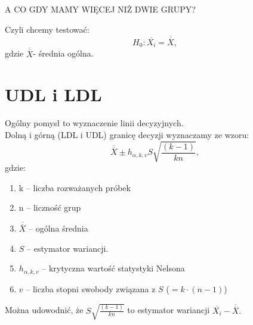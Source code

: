\documentclass{beamer}
\begin{document}
   \begin{frame}
A CO GDY MAMY WIĘCEJ NIŻ DWIE GRUPY?\\

\bigskip

Czyli chcemy testować:
$$H_0:\overline{X_i}=\overline{\overline{X}}, $$
gdzie $\overline{\overline{X}}$- średnia ogólna.\\
\end{frame} 

\section{UDL i LDL}

\begin{frame}
Ogólny pomysł to wyznaczenie linii decyzyjnych.\\
Dolną i górną (LDL i UDL) granicę decyzji wyznaczamy ze wzoru:
$$ \overline{\overline{X}} \pm   h_{\alpha,k,v}S\sqrt{\frac{(k-1)}{kn}}, $$
gdzie:
\begin{enumerate}
		\item[] k -- liczba rozważanych próbek
		\item[] n -- liczność grup
		\item[] $ \overline{\overline{X}}$ -- ogólna średnia
		\item[] %
		$S$ -- estymator wariancji.
		\item[] $h_{\alpha,k,v}$ -- krytyczna wartość statystyki Nelsona
		\item[] $v$ -- liczba stopni swobody związana z $S$ ($=k\cdot(n-1)$)
	\end{enumerate} 
Można udowodnić, że $S\sqrt{\frac{(k-1)}{kn}}$ to estymator wariancji $\overline{X_i}-\overline{\overline{X}}.$
\end{frame} 
\end{document}
